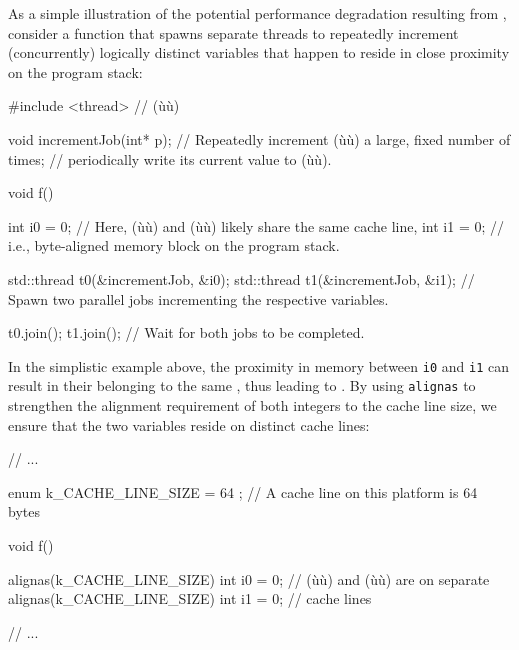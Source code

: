 As a simple illustration of the potential
performance degradation resulting from , consider
a function that spawns separate threads to repeatedly increment
(concurrently) logically distinct variables that happen to reside in
close proximity on the program stack:

\begin{emcppslisting}
#include <thread>  // (ù{}ù)

void incrementJob(int* p);
    // Repeatedly increment (ù{}ù) a large, fixed number of times;
    // periodically write its current value to (ù{}ù).

void f()
{
    int i0 = 0;  // Here, (ù{}ù) and (ù{}ù) likely share the same cache line,
    int i1 = 0;  // i.e., byte-aligned memory block on the program stack.

    std::thread t0(&incrementJob, &i0);
    std::thread t1(&incrementJob, &i1);
        // Spawn two parallel jobs incrementing the respective variables.

    t0.join();
    t1.join();
        // Wait for both jobs to be completed.
}
\end{emcppslisting}
    
\noindent In the simplistic example above, the proximity in memory between
\lstinline!i0! and \lstinline!i1! can result in their belonging to the same
, thus leading to . By
using \lstinline!alignas! to strengthen the alignment requirement of both integers to the cache line size, we
ensure that the two variables reside on distinct cache lines:

%
%
\begin{emcppslisting}
// ...

enum { k_CACHE_LINE_SIZE = 64 };  // A cache line on this platform is 64 bytes

void f()
{
    alignas(k_CACHE_LINE_SIZE) int i0 = 0; // (ù{}ù) and (ù{}ù) are on separate
    alignas(k_CACHE_LINE_SIZE) int i1 = 0; // cache lines

    // ...
}
\end{emcppslisting}
    
